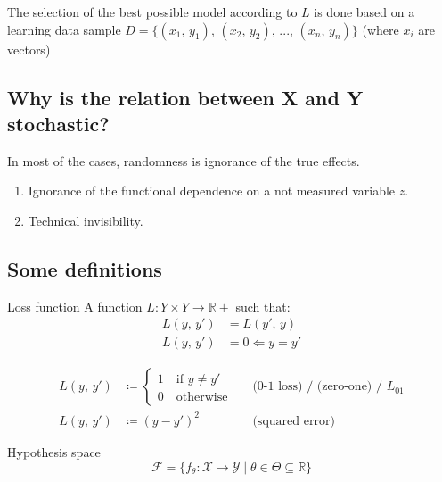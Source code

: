 The selection of the best possible model according to \(L\) is done
based on a learning data sample
\(D = \bigl\{(x_1,\, y_1),\, (x_2,\, y_2),\, ...,\, (x_n,\, y_n)\bigr\}\) (where \(x_i\) are
vectors)

\subsection{Why is the relation between X and Y stochastic?}

In most of the cases, randomness is ignorance of the true effects.
\begin{enumerate}
	\item
	      Ignorance of the functional dependence on a not measured variable
	      \(z\).
	\item
	      Technical invisibility.
\end{enumerate}

\subsection{Some definitions}

\begin{definition}{Loss function}{}
	A function
	\(L: Y \times Y \longrightarrow \mathds{R}+\) such that:
	\begin{align*}
		L(y,\, y') & = L(y',\, y) \tag{symmetry} \\
		L(y,\, y') & = 0  \Longleftarrow y = y'
	\end{align*}

  \tcblower
	\begin{align*}
		L(y,\, y') & \coloneqq \begin{cases}1 \quad \text{if } y \neq y' \\ 0 \quad \text{otherwise} \end{cases} &  & \text{(0-1 loss) / (zero-one) / } L_{01} \\
		L(y,\, y') & \coloneqq (y - y')^2                                                                        &  & \text{(squared error)}
	\end{align*}
\end{definition}

\begin{definition}{Hypothesis space}{}
	\begin{equation*}
		\mathcal{F} = \bigl\{f_\theta: \mathcal{X} \rightarrow \mathcal{Y} \mid \theta \in \varTheta \subseteq \mathds{R} \bigr\}
	\end{equation*}
\end{definition}


